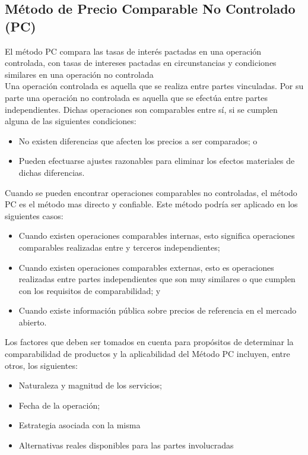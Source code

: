 \subsection{Método de Precio Comparable No Controlado (PC)}

El método \textcolor{principal}{PC} compara las tasas de interés pactadas en una operación controlada, con tasas de intereses pactadas en circunstancias y condiciones similares en una operación no controlada\\

Una operación controlada es aquella que se realiza entre partes vinculadas. Por su parte una operación no controlada es aquella que se efectúa entre partes independientes. Dichas operaciones son comparables entre sí, si se cumplen alguna de las siguientes condiciones:\\

\begin{itemize}
\item No existen diferencias que afecten los precios a ser comparados; o
\item Pueden efectuarse ajustes razonables para eliminar los efectos materiales de dichas
diferencias.
\end{itemize}


Cuando se pueden encontrar operaciones comparables no controladas, el método PC es el método mas directo y confiable. Este método podría ser aplicado en los siguientes casos:\\

\begin{itemize}
\item Cuando existen operaciones comparables internas, esto significa operaciones comparables realizadas entre \empresaCorto{} y terceros independientes;
\item Cuando existen operaciones comparables externas, esto es operaciones realizadas entre partes independientes que son muy similares o que cumplen con los requisitos de comparabilidad; y
\item Cuando existe información pública sobre precios de referencia en el mercado abierto.
\end{itemize}

Los factores que deben ser tomados en cuenta para propósitos de determinar la comparabilidad de productos y la aplicabilidad del Método PC incluyen, entre otros, los siguientes:\\

\begin{itemize}
\item Naturaleza y magnitud de los servicios;
\item Fecha de la operación;
\item Estrategia asociada con la misma
\item Alternativas reales disponibles para las partes involucradas

\end{itemize}

